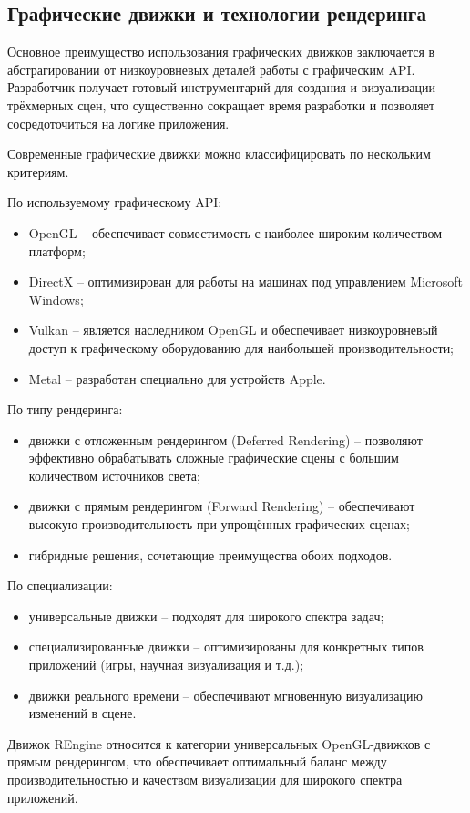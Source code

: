\subsection{Графические движки и технологии рендеринга}

Основное преимущество использования графических движков заключается в абстрагировании от низкоуровневых деталей работы с графическим API. Разработчик получает готовый инструментарий для создания и визуализации трёхмерных сцен, что существенно сокращает время разработки и позволяет сосредоточиться на логике приложения.

Современные графические движки можно классифицировать по нескольким критериям.

По используемому графическому API:
\begin{itemize}
\item OpenGL -- обеспечивает совместимость с наиболее широким количеством платформ;
\item DirectX -- оптимизирован для работы на машинах под управлением Microsoft Windows;
\item Vulkan -- является наследником OpenGL и обеспечивает низкоуровневый доступ к графическому оборудованию для наибольшей производительности;
\item Metal -- разработан специально для устройств Apple.
\end{itemize}

По типу рендеринга:
\begin{itemize}
\item движки с отложенным рендерингом (Deferred Rendering) -- позволяют эффективно обрабатывать сложные графические сцены с большим количеством источников света;
\item движки с прямым рендерингом (Forward Rendering) -- обеспечивают высокую производительность при упрощённых графических сценах;
\item гибридные решения, сочетающие преимущества обоих подходов.
\end{itemize}

По специализации:
\begin{itemize}
\item универсальные движки -- подходят для широкого спектра задач;
\item специализированные движки -- оптимизированы для конкретных типов приложений (игры, научная визуализация и т.д.);
\item движки реального времени -- обеспечивают мгновенную визуализацию изменений в сцене.
\end{itemize}

Движок REngine относится к категории универсальных OpenGL-движков с прямым рендерингом, что обеспечивает оптимальный баланс между производительностью и качеством визуализации для широкого спектра приложений.
